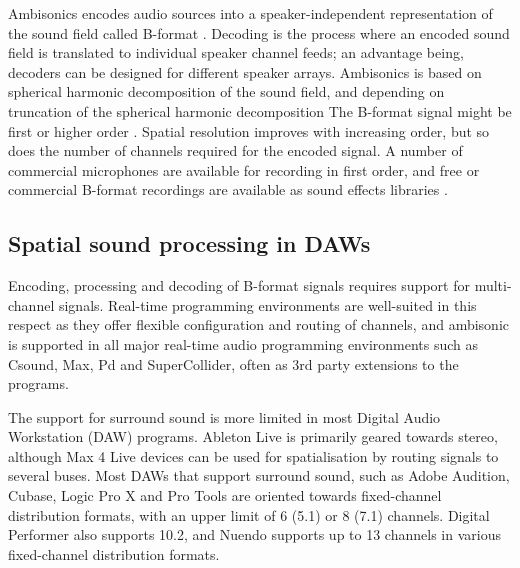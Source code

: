 \documentclass{article}
\begin{document}
Ambisonics encodes audio sources into a speaker-inde\-pendent representation of the sound field called B-format  \cite{gerzon:1985JAES}.
Decoding is the process where an encoded sound field is translated to individual speaker channel feeds; an advantage being,  decoders can be designed for different speak\-er arrays.
Ambisonics is based on spherical harmonic decomposition of the sound field, and depending on truncation of the spherical harmonic decomposition
The B-for\-mat signal might be first or higher order \cite{daniel:2001phd}.
Spatial resolution improves with increasing order, but so does the number of channels required for the encoded signal.
A number of commercial microphones are available for recording in first order, and free or commercial B-format recordings are available as sound effects libraries \cite{farrar:1979soundfield,deleflie2014:ambisonia,darcourt:2014surlib}.




\subsection{Spatial sound processing in DAWs}\label{sec:daws}

Encoding, processing and decoding of B-format signals requires support for multi-channel signals.
Real-time programming environments are well-suited in this respect as they offer flexible configuration and routing of channels, and ambisonic is supported in all major real-time audio programming environments such as Csound, Max, Pd and SuperCollider, often as 3rd party extensions to the programs.

The support for surround sound is more limited in most Digital Audio Workstation (DAW) programs.
Ableton Live is primarily geared towards stereo, although Max 4 Live devices can be used for spatialisation by routing signals to several buses.
Most DAWs that support surround sound, such as Adobe Audition, Cubase, Logic Pro X and Pro Tools are oriented towards fixed-channel distribution formats, with an upper limit of 6 (5.1) or 8 (7.1) channels.
Digital Performer also supports 10.2, and Nuendo supports up to 13 channels in various fixed-channel distribution formats.
\end{document}
